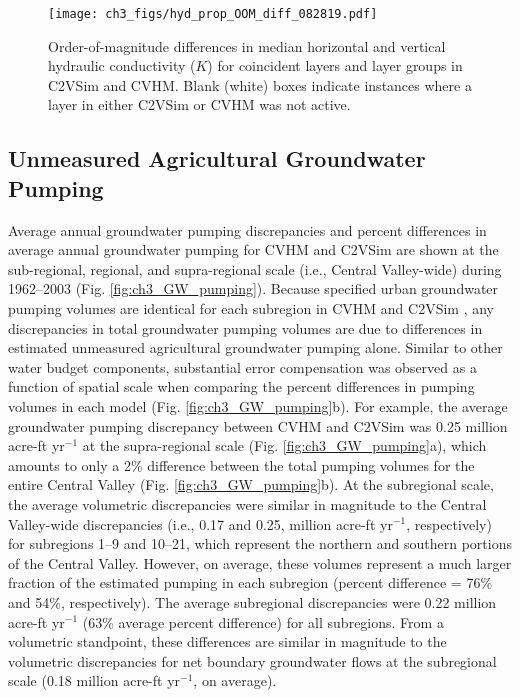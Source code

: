 \begin{figure}[ht!]
\centerline{\texttt{[image: ch3\_figs/hyd\_prop\_OOM\_diff\_082819.pdf]}}
\caption{Order-of-magnitude differences in median horizontal and vertical hydraulic conductivity ($K$) for coincident layers and layer groups in C2VSim and CVHM. Blank (white) boxes indicate instances where a layer in either C2VSim or CVHM was not active.}
\label{fig:ch3_hyd_prop_OOM}
\end{figure}

\subsection{Unmeasured Agricultural Groundwater Pumping}

Average annual groundwater pumping discrepancies and percent differences in average annual groundwater pumping for CVHM and C2VSim are shown at the sub-regional, regional, and supra-regional scale (i.e., Central Valley-wide) during 1962–2003 (Fig. \ref{fig:ch3_GW_pumping}). Because specified urban groundwater pumping volumes are identical for each subregion in CVHM and C2VSim \citep{faunt2009groundwater}, any discrepancies in total groundwater pumping volumes are due to differences in estimated unmeasured agricultural groundwater pumping alone. Similar to other water budget components, substantial error compensation was observed as a function of spatial scale when comparing the percent differences in pumping volumes in each model (Fig. \ref{fig:ch3_GW_pumping}b). For example, the average groundwater pumping discrepancy between CVHM and C2VSim was 0.25 million acre-ft yr$^{-1}$ at the supra-regional scale (Fig. \ref{fig:ch3_GW_pumping}a), which amounts to only a 2\% difference between the total pumping volumes for the entire Central Valley (Fig. \ref{fig:ch3_GW_pumping}b). At the subregional scale, the average volumetric discrepancies were similar in magnitude to the Central Valley-wide discrepancies (i.e., 0.17 and 0.25, million acre-ft yr$^{-1}$, respectively) for subregions 1--9 and 10--21, which represent the northern and southern portions of the Central Valley. However, on average, these volumes represent a much larger fraction of the estimated pumping in each subregion (percent difference = 76\% and 54\%, respectively). The average subregional discrepancies were 0.22 million acre-ft yr$^{-1}$ (63\% average percent difference) for all subregions. From a volumetric standpoint, these differences are similar in magnitude to the volumetric discrepancies for net boundary groundwater flows at the subregional scale (0.18 million acre-ft yr$^{-1}$, on average).


